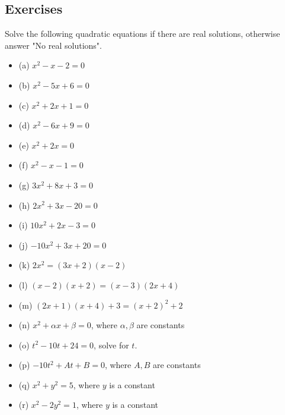 \documentclass{article}
\begin{document}
\subsection{Exercises}
Solve the following quadratic equations if there are real solutions, otherwise answer "No real solutions".
\begin{itemize}
\item[] (a) $x^2 - x - 2 = 0$\\[50pt]
\item[] (b) $x^2 - 5x + 6 = 0$\\[50pt]
\item[] (c) $x^2 + 2x + 1  = 0$\\[50pt]
\item[] (d) $x^2 - 6x + 9 = 0$\\[50pt]
\item[] (e) $x^2 + 2x = 0$\\[50pt]
\item[] (f) $x^2 - x - 1 = 0$\\[50pt]
\item[] (g) $3x^2 + 8x + 3 = 0$\\[50pt]
\item[] (h) $2x^2 + 3x - 20 = 0$\\[50pt]
\item[] (i) $10x^2 + 2x - 3 = 0$\\[50pt]
\item[] (j) $-10x^2 + 3x + 20 = 0$\\[50pt]
\item[] (k) $2x^2 = (3x + 2)(x-2)$\\[50pt]
\item[] (l) $(x-2)(x+2) = (x-3)(2x+4)$\\[50pt]
\item[] (m) $(2x + 1)(x + 4) + 3 = (x+2)^2 + 2$\\[50pt]
\item[] (n) $x^2 + \alpha x + \beta = 0$, where $\alpha,\beta$ are constants\\[50pt]
\item[] (o) $t^2 - 10t + 24 = 0$, solve for $t$. \\[50pt]
\item[] (p) $-10t^2 + A t + B = 0$, where $A,B$ are constants\\[50pt]
\item[] (q) $x^2 + y^2 = 5$, where $y$ is a constant\\[50pt]
\item[] (r) $x^2 - 2y^2 = 1$, where $y$ is a constant\\[50pt]
\end{itemize}
\clearpage
\end{document}
